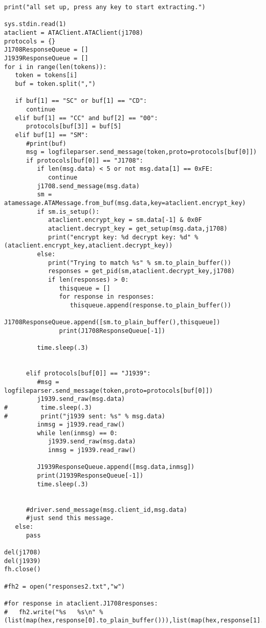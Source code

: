 \begin{appendices}
\begin{verbatim}
print("all set up, press any key to start extracting.")

sys.stdin.read(1)
ataclient = ATAClient.ATAClient(j1708)
protocols = {}
J1708ResponseQueue = []
J1939ResponseQueue = []
for i in range(len(tokens)):
   token = tokens[i]
   buf = token.split(",")
   
   if buf[1] == "SC" or buf[1] == "CD":
      continue
   elif buf[1] == "CC" and buf[2] == "00":
      protocols[buf[3]] = buf[5]
   elif buf[1] == "SM":
      #print(buf)
      msg = logfileparser.send_message(token,proto=protocols[buf[0]])
      if protocols[buf[0]] == "J1708":
         if len(msg.data) < 5 or not msg.data[1] == 0xFE:
            continue
         j1708.send_message(msg.data)
         sm = atamessage.ATAMessage.from_buf(msg.data,key=ataclient.encrypt_key)
         if sm.is_setup():
            ataclient.encrypt_key = sm.data[-1] & 0x0F
            ataclient.decrypt_key = get_setup(msg.data,j1708)
            print("encrypt key: %d decrypt key: %d" % (ataclient.encrypt_key,ataclient.decrypt_key))
         else:
            print("Trying to match %s" % sm.to_plain_buffer())
            responses = get_pid(sm,ataclient.decrypt_key,j1708)
            if len(responses) > 0:
               thisqueue = []
               for response in responses:
                  thisqueue.append(response.to_plain_buffer())
               J1708ResponseQueue.append([sm.to_plain_buffer(),thisqueue])
               print(J1708ResponseQueue[-1])

         time.sleep(.3)

         
      elif protocols[buf[0]] == "J1939":
         #msg = logfileparser.send_message(token,proto=protocols[buf[0]])
         j1939.send_raw(msg.data)
#         time.sleep(.3)
#         print("j1939 sent: %s" % msg.data)
         inmsg = j1939.read_raw()
         while len(inmsg) == 0:
            j1939.send_raw(msg.data)
            inmsg = j1939.read_raw()

         J1939ResponseQueue.append([msg.data,inmsg])
         print(J1939ResponseQueue[-1])
         time.sleep(.3)

      
      #driver.send_message(msg.client_id,msg.data)
      #just send this message.
   else:
      pass

del(j1708)
del(j1939)
fh.close()

#fh2 = open("responses2.txt","w")

#for response in ataclient.J1708responses:
#   fh2.write("%s   %s\n" % (list(map(hex,response[0].to_plain_buffer())),list(map(hex,response[1].to_plain_buffer()))))


\end{verbatim}
\end{appendices}
